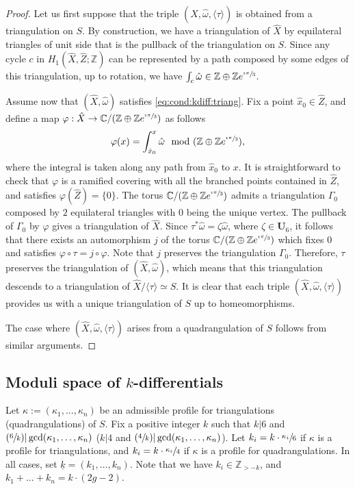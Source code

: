\documentclass[JEP,XML,SOM,Unicode]{cedram}
\newcommand{\Psfrac}[2]{(\sfrac{#1}{#2})}
\theoremstyle{plain}
\theoremstyle{definition}
\def\C{\mathbb{C}}
\newcommand\Z{\mathbb{Z}}
\newcommand{\Ub}{\mathbf{U}}
\newcommand{\hx}{\hat{x}}
\newcommand{\hZ}{\hat{Z}}
\newcommand{\homg}{\hat{\omega}}
\let\G\Gamma
\let\ul\underline
\begin{document}
\begin{proof}
Let us first suppose that the triple $(\hat{X},\hat{\omega},\langle\tau\rangle)$ is obtained from a triangulation on $S$. By construction, we have a triangulation of $\hat{X}$ by equilateral triangles of unit side that is the pullback of the triangulation on $S$. Since any cycle $c$ in $H_1(\hat{X},\hat{Z};\Z)$ can be represented by a path composed by some edges of this triangulation, up to rotation, we have $\int_c\homg \in \Z\oplus\Z e^{\sfrac{\imath\pi}{3}}$.

Assume now that $(\hat{X},\hat{\omega})$ satisfies \eqref{eq:cond:kdiff:triang}. Fix a point $\hx_0 \in \hZ$, and define a map $\varphi: \hat{X} \to \C/(\Z\oplus\Z e^{\sfrac{\imath\pi}{3}})$ as follows
\[
\varphi(x)=\int_{\hat{x}_0}^x \hat{\omega} \mod (\Z\oplus\Z e^{\sfrac{\imath\pi}{3}}),
\]
where the integral is taken along any path from $\hat{x}_0$ to $x$.
It is straightforward to check that $\varphi$ is a ramified covering with all the branched points contained in $\hat{Z}$, and satisfies $\varphi(\hat{Z})=\{0\}$.
The torus $\C/(\Z\oplus\Z e^{\sfrac{\imath\pi}{3}})$ admits a triangulation $\G_0$ composed by $2$ equilateral triangles with $0$ being the unique vertex.
The pullback of $\G_0$ by $\varphi$ gives a triangulation of $\hat{X}$.
Since $\tau^*\hat{\omega}=\zeta\hat{\omega}$, where $\zeta \in \Ub_6$, it follows that there exists an automorphism $j$ of the torus $\C/(\Z\oplus\Z e^{\sfrac{\imath\pi}{3}})$ which fixes $0$ and satisfies $\varphi\circ\tau=j\circ\varphi$. Note that $j$ preserves the triangulation $\G_0$.
Therefore, $\tau$ preserves the triangulation of $(\hat{X},\hat{\omega})$, which means that
this triangulation descends to a triangulation of $\hat{X}/\langle \tau \rangle\simeq S$.
It is clear that each triple $(\hat{X},\hat{\omega},\langle \tau \rangle)$ provides us with a unique triangulation of $S$ up to homeomorphisms.

The case where $(\hat{X},\hat{\omega},\langle \tau \rangle)$ arises from a quadrangulation of $S$ follows from similar arguments.
\end{proof}

\subsection{Moduli space of $k$-differentials}\label{sec:mod:sp:kdiff}
Let $\kappa:=(\kappa_1,\dots,\kappa_n)$ be an admissible profile for triangulations (\resp quadrangulations) of $S$. Fix a positive integer $k$ such that $k|6$ and $\Psfrac{6}{k} | \gcd(\kappa_1,\dots,\kappa_n)$ (\resp $k | 4$ and $\Psfrac{4}{k} | \gcd(\kappa_1,\dots,\kappa_n)$). Let $k_i=k\cdot\sfrac{\kappa_i}{6}$ if $\kappa$ is a profile for triangulations, and $k_i=k\cdot\sfrac{\kappa_i}{4}$ if $\kappa$ is a profile for quadrangulations. In all cases, set $\ul{k}=(k_1,\dots,k_n)$.
Note that we have $k_i\in \Z_{>-k}$, and $k_1+\dots+k_n=k\cdot(2g-2)$.
\end{document}
